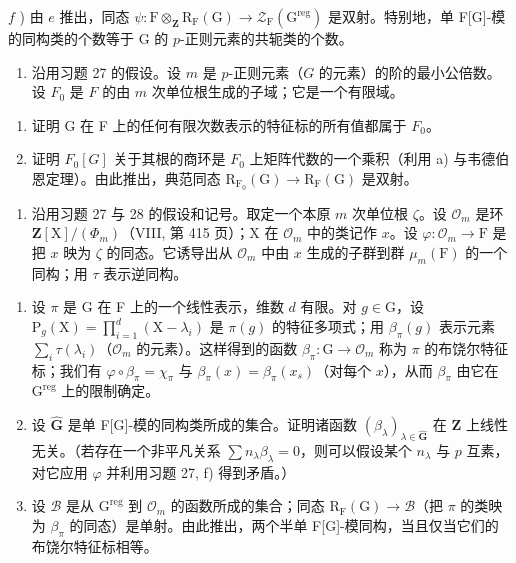 \(f\) ) 由 \(e\) 推出，同态 \(\psi : \mathrm{F} \otimes_{\mathbf{Z}} \mathrm{R}_{\mathrm{F}}(\mathrm{G}) \to \mathcal{Z}_{\mathrm{F}}(\mathrm{G}^{\mathrm{reg}})\) 是双射。特别地，单 F{[}G{]}-模的同构类的个数等于 G 的 \(p\)-正则元素的共轭类的个数。

\begin{enumerate}
\def\labelenumi{\arabic{enumi})}
\setcounter{enumi}{27}
\tightlist
\item
  沿用习题 27 的假设。设 \(m\) 是 \(p\)-正则元素（\(G\) 的元素）的阶的最小公倍数。设 \(F_0\) 是 \(F\) 的由 \(m\) 次单位根生成的子域；它是一个有限域。
\end{enumerate}

\begin{enumerate}
\def\labelenumi{\alph{enumi})}
\item
  证明 G 在 F 上的任何有限次数表示的特征标的所有值都属于 \(F_{0}\)。
\item
  证明 \(F_{0}[G]\) 关于其根的商环是 \(F_{0}\) 上矩阵代数的一个乘积（利用 a) 与韦德伯恩定理）。由此推出，典范同态 \(\mathrm{R}_{\mathrm{F}_{0}}(\mathrm{G}) \to \mathrm{R}_{\mathrm{F}}(\mathrm{G})\) 是双射。
\end{enumerate}

\begin{enumerate}
\def\labelenumi{\arabic{enumi})}
\setcounter{enumi}{28}
\tightlist
\item
  沿用习题 27 与 28 的假设和记号。取定一个本原 \(m\) 次单位根 \(\zeta\)。设 \(\mathcal{O}_m\) 是环 \(\mathbf{Z}[\mathrm{X}] / (\Phi_m)\)（VIII, 第 415 页）；X 在 \(\mathcal{O}_m\) 中的类记作 \(x\)。设 \(\varphi : \mathcal{O}_m \to \mathrm{F}\) 是把 \(x\) 映为 \(\zeta\) 的同态。它诱导出从 \(\mathcal{O}_m\) 中由 \(x\) 生成的子群到群 \(\mu_m(\mathrm{F})\) 的一个同构；用 \(\tau\) 表示逆同构。
\end{enumerate}

\begin{enumerate}
\def\labelenumi{\alph{enumi})}
\item
  设 \(\pi\) 是 G 在 F 上的一个线性表示，维数 \(d\) 有限。对 \(g \in \mathrm{G}\)，设 \(\mathrm{P}_g(\mathrm{X}) = \prod_{i=1}^d (\mathrm{X} - \lambda_i)\) 是 \(\pi(g)\) 的特征多项式；用 \(\beta_{\pi}(g)\) 表示元素 \(\sum_{i} \tau(\lambda_i)\)（\(\mathcal{O}_m\) 的元素）。这样得到的函数 \(\beta_{\pi}: \mathrm{G} \to \mathcal{O}_m\) 称为 \(\pi\) 的布饶尔特征标；我们有 \(\varphi \circ \beta_{\pi} = \chi_{\pi}\) 与 \(\beta_{\pi}(x) = \beta_{\pi}(x_s)\)（对每个 \(x\)），从而 \(\beta_{\pi}\) 由它在 \(\mathrm{G}^{\mathrm{reg}}\) 上的限制确定。
\item
  设 \(\widehat{\mathbf{G}}\) 是单 F{[}G{]}-模的同构类所成的集合。证明诸函数 \((\beta_{\lambda})_{\lambda \in \widehat{\mathbf{G}}}\) 在 \(\mathbf{Z}\) 上线性无关。（若存在一个非平凡关系 \(\sum n_{\lambda} \beta_{\lambda} = 0\)，则可以假设某个 \(n_{\lambda}\) 与 \(p\) 互素，对它应用 \(\varphi\) 并利用习题 27, f) 得到矛盾。）
\item
  设 \(\mathcal{B}\) 是从 \(\mathrm{G}^{\mathrm{reg}}\) 到 \(\mathcal{O}_m\) 的函数所成的集合；同态 \(\mathrm{R}_{\mathrm{F}}(\mathrm{G}) \to \mathcal{B}\)（把 \(\pi\) 的类映为 \(\beta_{\pi}\) 的同态）是单射。由此推出，两个半单 F{[}G{]}-模同构，当且仅当它们的布饶尔特征标相等。
\end{enumerate}

